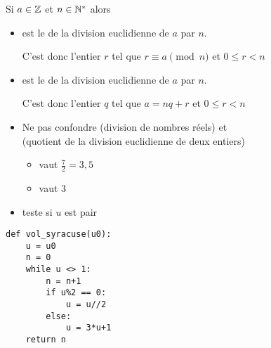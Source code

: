 \begin{frame}


Si $a \in \mathbb{Z}$ et $n\in\mathbb{N}^*$ alors
\begin{itemize}
  \item {} est le  de la division euclidienne de $a$ par $n$.
 
\pause
C'est donc l'entier $r$ tel que $r \equiv a \pmod{n}$ et $0 \le r < n$

 
\pause  

  \item {} est le  de la division euclidienne de $a$ par $n$.
 
\pause  
  C'est donc l'entier $q$ tel que $a=nq+r$ et $0\leq r <n$
  
  
\end{itemize}

 
\pause
\bigskip
\begin{itemize}
  \item Ne pas confondre  (division de nombres réels)
  et \\
   (quotient de la division euclidienne de deux entiers)  
\pause
  \begin{itemize}
    \item {} vaut $\frac72 = 3,5$
    \smallskip
    \item {} vaut $3$
  \end{itemize}
 
\pause  
  \item {} teste si $u$ est pair
  
\end{itemize}


\end{frame}


\begin{frame}[fragile]

\begin{algo}
\begin{lstlisting}
def vol_syracuse(u0):
    u = u0
    n = 0
    while u <> 1:
        n = n+1
        if u%2 == 0:
            u = u//2
        else:
            u = 3*u+1
    return n
\end{lstlisting}
\end{algo}

\end{frame}




